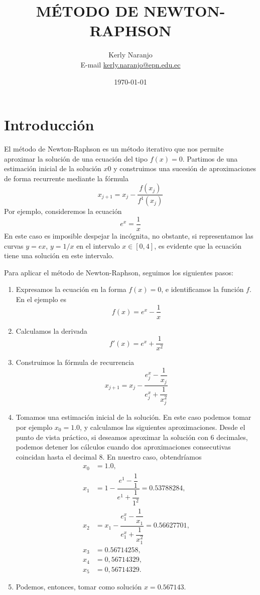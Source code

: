 \documentclass[a4paper, 12pt]{article}
\author{Kerly Naranjo \\ E-mail \href{mailto:kerly.naranjo@epn.edu.ec}{kerly.naranjo@epn.edu.ec}}
\title{MÉTODO DE NEWTON-RAPHSON}
\date{\today}
\begin{document}
	\maketitle


\section*{Introducción}
El método de Newton-Raphson es un método iterativo que nos permite
aproximar la solución de una ecuación del tipo \(f(x)=0\). Partimos de una estimación inicial de la solución \(x0\) y construimos una sucesión de aproximaciones de forma recurrente mediante la fórmula
\[ x_{j+1} = x_j-\dfrac{f(x_j)}{f^1(x_j)} \]
Por ejemplo, consideremos la ecuación
\[e^x=\dfrac{1}{x}\]
En este caso es imposible despejar la incógnita, no obstante, si representamos las curvas \(y = ex\), \(y = 1/x\) en el intervalo \(x \in [0, 4]\), es evidente que la ecuación tiene una solución en este intervalo.

Para aplicar el método de Newton-Raphson, seguimos los siguientes pasos:
\begin{enumerate}
	 \item Expresamos la ecuación en la forma \(f(x)=0\), e identificamos la función \(f\). En el ejemplo es
	 \[f(x)=e^x-\dfrac{1}{x}\]
	 \item Calculamos la derivada
	 \[f'(x)=e^x+\dfrac{1}{x^2}\]
	 \item Construimos la fórmula de recurrencia
	 \[x_{j+1}=x_j-\dfrac{e^x_j-\dfrac{1}{x_j}}{e^x_j+\dfrac{1}{x^{2}_{j}}}\]
	 \item Tomamos una estimación inicial de la solución. En este caso podemos tomar por ejemplo \(x_0 = 1.0\), y calculamos las siguientes aproximaciones. Desde el punto de vista práctico, si deseamos aproximar la solución con 6 decimales, podemos detener los cálculos cuando dos aproximaciones consecutivas coincidan hasta el decimal 8. En nuestro caso, obtendríamos
	 \begin{align}
	 	x_0 &= 1.0, \nonumber \\
	 	x_1 &= 1-\dfrac{e^1-\dfrac{1}{1}}{e^1+\dfrac{1}{1^2}}=0.53788284, \nonumber \\
	 	x_2 &= x_1-\dfrac{e^x_1-\dfrac{1}{x_1}}{e^x_1+\dfrac{1}{x^{2}_{1}}} = 0.56627701, \nonumber \\
	 	x_3 &= 0.56714258, \nonumber \\
	 	x_4 &= 0,56714329, \nonumber \\
	 	x_5 &= 0,56714329. \nonumber
	 \end{align}
	\item Podemos, entonces, tomar como solución \(x = 0.567143\).
\end{enumerate}
\end{document}

